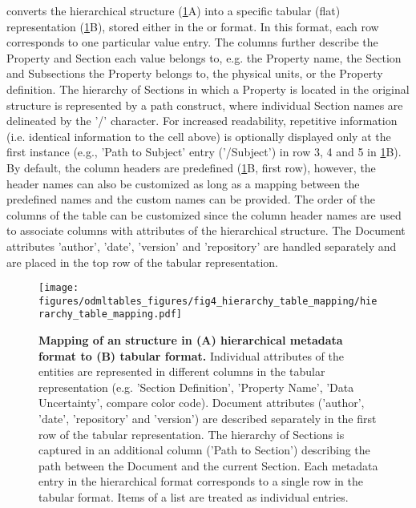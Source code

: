  converts the hierarchical  structure (\cref{fig:tree_and_table}A) into a specific tabular (flat) representation (\cref{fig:tree_and_table}B), stored either in the  or  format. In this format, each row corresponds to one particular value entry. The columns further describe the Property and Section each value belongs to, e.g. the Property name, the Section and Subsections the Property belongs to, the physical units, or the Property definition. The hierarchy of Sections in which a Property is located in the original  structure is represented by a path construct, where individual Section names are delineated by the '/' character. For increased readability, repetitive information (i.e. identical information to the cell above) is optionally displayed only at the first instance (e.g., 'Path to Subject' entry ('/Subject') in row 3, 4 and 5 in \cref{fig:tree_and_table}B). By default, the  column headers are predefined (\cref{fig:tree_and_table}B, first row), however, the header names can also be customized as long as a mapping between the predefined names and the custom names can be provided. The order of the columns of the table can be customized since the column header names are used to associate columns with attributes of the hierarchical  structure. The  Document attributes 'author', 'date', 'version' and 'repository' are handled separately and are placed in the top row of the tabular  representation.

\begin{figure}[hbt]
\begin{center}
\texttt{[image: figures/odmltables\_figures/fig4\_hierarchy\_table\_mapping/hierarchy\_table\_mapping.pdf]}
\caption[Mapping between hierarchical and tabular metadata format]{{\label{fig:tree_and_table}
\textbf{Mapping of an  structure in (A) hierarchical metadata format to (B) tabular format.} Individual attributes of the  entities are represented in different columns in the tabular representation (e.g. 'Section Definition', 'Property Name', 'Data Uncertainty', compare color code). Document attributes ('author', 'date', 'repository' and 'version') are described separately in the first row of the tabular representation. The hierarchy of Sections is captured in an additional column ('Path to Section') describing the path between the  Document and the current Section. Each metadata entry in the hierarchical format corresponds to a single row in the tabular format. Items of a list are treated as individual entries.
}}
\end{center}
\end{figure}

